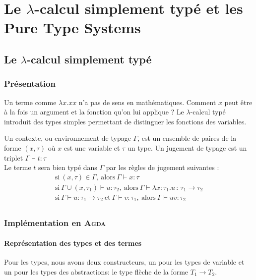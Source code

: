 \chapter{Le \texorpdfstring{$\lambda$}{lambda}-calcul simplement typé et les Pure Type Systems}

\section{Le $\lambda$-calcul simplement typé}
\subsection{Présentation}
Un terme comme $\lambda x.xx$ n'a pas de sens en mathématiques. Comment $x$ peut être à la fois un argument et la fonction qu'on
lui applique ? Le $\lambda$-calcul typé introduit des types simples permettant de distinguer les fonctions des variables.

Un contexte, ou environnement de typage $\Gamma$, est un ensemble de paires de la forme 
$( x , \tau )$  où $x$ est une variable et $\tau$ un type.
 Un jugement de typage est un triplet $\Gamma \vdash t:\tau$  \\

 Le terme $t$ sera bien typé dans $\Gamma$  par les règles de jugement suivantes :
\begin{gather*}
  \mathrm{si}\ (x,\tau ) \in \Gamma  ,\  \mathrm{alors}\ \Gamma \vdash x:\tau  \\
  \mathrm{si}\  \Gamma \cup (x,\tau _{1})\vdash u:\tau _{2},\  \mathrm{alors}\ \Gamma \vdash \lambda x\!:\!\tau _{1}.u\,:\,\tau _{1}\rightarrow \tau _{2} \\
  \mathrm{si}\ \Gamma \vdash u:\tau _{1}\rightarrow \tau _{2}\ \mathrm{et}\ \Gamma \vdash v:\tau _{1},\  
    \mathrm{alors}\  \Gamma \vdash uv:\tau _{2} \\ 
\end{gather*}

\subsection{Implémentation en \textsc{Agda}}
\subsubsection{Représentation des types et des termes}
Pour les types, nous avons deux constructeurs, un pour les types de variable et un
 pour les types des abstractions: le type flèche de la forme  $T_1 \rightarrow T_2$.

